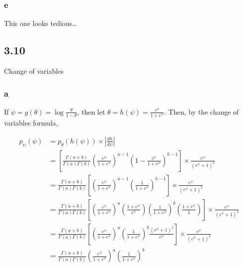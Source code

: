 \documentclass[
]{article}
\begin{document}
\hypertarget{e-2}{%
\subsubsection{e}\label{e-2}}

This one looks tedious\ldots{}

\hypertarget{section-6}{%
\subsection{3.10}\label{section-6}}

Change of variables

\hypertarget{a-5}{%
\subsubsection{a}\label{a-5}}

If \(\psi = g(\theta) = \log \frac{\theta}{1 - \theta}\), then let
\(\theta = h(\psi) = \frac{e^\psi}{1 + e^\psi}\). Then, by the change of
variables formula,

\begin{align}
p_{\psi}(\psi) &= p_{\theta}(h(\psi)) \times \left| \frac{dh}{d\psi} \right| \\
&= \left[ \frac{\Gamma(a + b)}{\Gamma(a) \Gamma(b)} \left( \frac{e^\psi}{1 + e^\psi}  \right)^{a - 1} \left( 1 - \frac{e^\psi}{1 + e^\psi} \right)^{b - 1} \right] \times \frac{e^\psi}{(e^\psi + 1)^2} \\
&= \frac{\Gamma(a + b)}{\Gamma(a)\Gamma(b)} \left[ \left( \frac{e^\psi}{1 + e^\psi}  \right)^{a - 1} \left( \frac{1}{1 + e^\psi} \right)^{b - 1} \right] \times \frac{e^\psi}{(e^\psi + 1)^2} \\
&= \frac{\Gamma(a + b)}{\Gamma(a)\Gamma(b)} \left[ \left( \frac{e^\psi}{1 + e^\psi}  \right)^a \left( \frac{1 + e^\psi}{e^\psi} \right) \left( \frac{1}{1 + e^\psi} \right)^b \left(\frac{1 + e^\psi}{1} \right) \right] \times \frac{e^\psi}{(e^\psi + 1)^2} \\
&= \frac{\Gamma(a + b)}{\Gamma(a)\Gamma(b)} \left[ \left( \frac{e^\psi}{1 + e^\psi}  \right)^a \left( \frac{1}{1 + e^\psi} \right)^b \frac{(e^\psi + 1)^2}{e^\psi} \right] \times \frac{e^\psi}{(e^\psi + 1)^2} \\
&= \frac{\Gamma(a + b)}{\Gamma(a)\Gamma(b)} \left( \frac{e^\psi}{1 + e^\psi}  \right)^a \left( \frac{1}{1 + e^\psi} \right)^b
\end{align}
\end{document}
